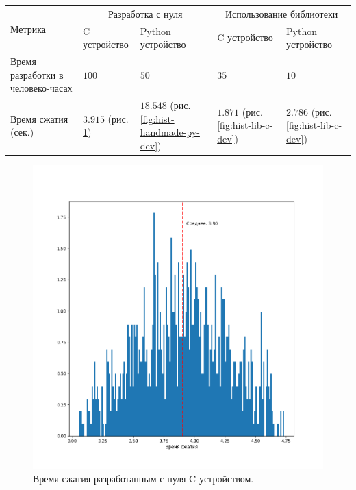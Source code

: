 \begin{longtable}{| p{3cm} | p{3cm} | p{3cm} | p{3cm} | p{3cm} |}
    \hline
        \multirow{2}{*}{Метрика} &
        \multicolumn{2}{c|}{Разработка с нуля} &
        \multicolumn{2}{c|}{Использование библиотеки} \\
    \cline{2-5} &
        C устройство &
        Python устройство &
        C устройство &
        Python устройство \\
    \hline
        Время разработки в человеко-часах &
        $100$ &
        $50$ &
        $35$ &
        $10$ \\
    \hline
        Время сжатия (сек.)&
        $3.915$  (рис. \ref{fig:hist-handmade-c-dev}) &
        $18.548$ (рис. \ref{fig:hist-handmade-py-dev}) &
        $1.871$  (рис. \ref{fig:hist-lib-c-dev}) &
        $2.786$  (рис. \ref{fig:hist-lib-c-dev}) \\
    \hline
\end{longtable}

\begin{figure}[!htbp]
    \centering
    \begin{adjustbox}{max totalsize={\textwidth}{\textheight}}
        \includegraphics{images/hist-handmade-c-dev.png}
    \end{adjustbox}
    \caption{Время сжатия разработанным с нуля C-устройством.}\label{fig:hist-handmade-c-dev}
\end{figure}


